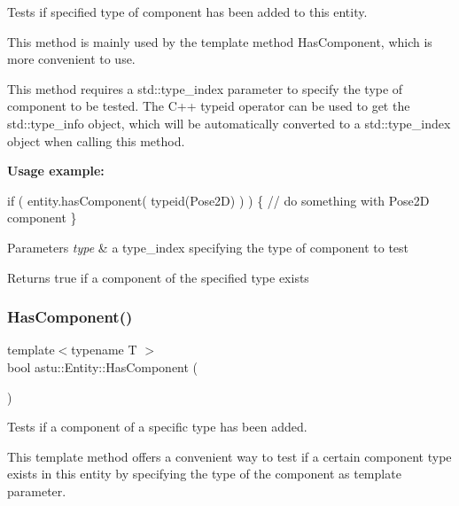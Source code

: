 Tests if specified type of component has been added to this entity.

This method is mainly used by the template method {\ttfamily Has\+Component}, which is more convenient to use.

This method requires a std\+::type\+\_\+index parameter to specify the type of component to be tested. The C++ {\ttfamily typeid} operator can be used to get the std\+::type\+\_\+info object, which will be automatically converted to a std\+::type\+\_\+index object when calling this method.

{\bfseries Usage example\+:} 
\begin{DoxyCode}
\textcolor{keywordflow}{if} ( entity.hasComponent( \textcolor{keyword}{typeid}(Pose2D) ) ) \{
    \textcolor{comment}{// do something with Pose2D component}
\}
\end{DoxyCode}



\begin{DoxyParams}{Parameters}
{\em type} & a type\+\_\+index specifying the type of component to test \\
\hline
\end{DoxyParams}
\begin{DoxyReturn}{Returns}
{\ttfamily true} if a component of the specified type exists 
\end{DoxyReturn}
\mbox{\label{classastu_1_1Entity_a80b75df1873d23f79f050bc6a178cd4c}} 
\subsubsection{\texorpdfstring{Has\+Component()}{HasComponent()}\hspace{0.1cm}{\footnotesize\ttfamily [2/2]}}
{\footnotesize\ttfamily template$<$typename T $>$ \\
bool astu\+::\+Entity\+::\+Has\+Component (\begin{DoxyParamCaption}{ }\end{DoxyParamCaption})\hspace{0.3cm}{\ttfamily [inline]}}

Tests if a component of a specific type has been added.

This template method offers a convenient way to test if a certain component type exists in this entity by specifying the type of the component as template parameter.

